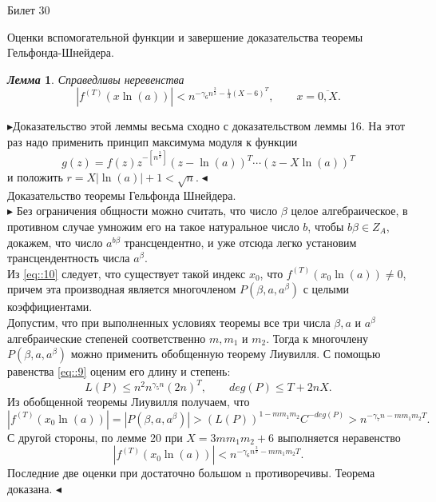\documentclass[a4paper,12pt]{article}
\newtheorem{lem}{\textit{Лемма}}
\newcommand{\q}{\quad}
\newcommand{\pb}{\blacktriangleright}
\newcommand{\pe}{\blacktriangleleft}
\begin{document}
\begin{mybox2}{\hypertarget{bil30}{Билет 30}}

\begin{formbox}{}
Оценки вспомогательной функции и завершение доказательства теоремы Гельфонда-Шнейдера.
\end{formbox}

\begin{formbox}{}
\begin{lem} 
Справедливы неревенства \[|f^{(T)}(x \ln (a))| < n^{-\gamma_6 n^\frac{3}{2} - \frac{1}{3}(X-6)^T},\q\q x=\overline{0, X}. \]
\end{lem}
\end{formbox}

$\pb$Доказательство этой леммы весьма сходно с доказательством леммы 16. На этот раз
надо применить принцип максимума модуля к функции \[g(z) = f(z)z^{-[n^\frac{3}{2}]} (z - \ln (a))^T\cdots (z - X \ln (a))^T\]
и положить \(r = X| \ln (a)| + 1 <\sqrt{n}.\pe\)\\

Доказательство теоремы Гельфонда Шнейдера. \\
$\pb$ Без ограничения общности можно считать, что число $\beta$ целое алгебраическое, в противном случае умножим его на такое
натуральное число $b$, чтобы $b\beta \in Z_A$, докажем, что число $a^{b\beta}$ трансцендентно, и уже отсюда легко установим трансцендентность числа $a^{\beta}$.\\
Из \ref{eq::10} следует, что существует такой индекс $x_0$, что \(f^{(T)}(x_0 \ln (a))\not= 0\), причем эта производная является многочленом $P(\beta, a, a^\beta)$ с целыми коэффициентами.\\
Допустим, что при выполненных условиях теоремы все три числа $\beta, a$ и $a^\beta$ алгебраические степеней соответственно $m, m_1$ и $m_2$. Тогда к многочлену $P(\beta, a, a^\beta)$ можно применить
обобщенную теорему Лиувилля. С помощью равенства \ref{eq::9} оценим его длину и степень: \[L(P) \le n^2n^{\gamma_5n}(2n)^T,\q\q deg (P) \le T + 2nX.\]
Из обобщенной теоремы Лиувилля получаем, что \[|f^{(T)} (x_0 \ln (a))| = |P(\beta, a, a^\beta)| > (L(P))^{1-mm_1m_2}C^{-deg (P)} > n^{-\gamma_7n-mm_1m_2T}
.\]
С другой стороны, по лемме 20 при $X = 3mm_1m_2 + 6$ выполняется неравенство
\[|f^{(T)}(x_0 \ln (a))| < n^{-\gamma_6n^\frac{3}{2} - mm_1m_2T}.\]
Последние две оценки при достаточно большом n противоречивы. Теорема доказана. $\pe$




\end{mybox2}
\end{document}
